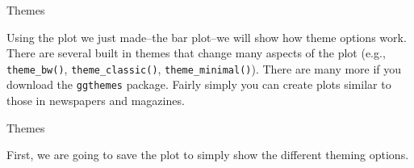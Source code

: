 \begin{frame}[fragile]{Themes}

Using the plot we just made--the bar plot--we will show how theme
options work. There are several built in themes that change many aspects
of the plot (e.g., \texttt{theme\_bw()}, \texttt{theme\_classic()},
\texttt{theme\_minimal()}). There are many more if you download the
\texttt{ggthemes} package. Fairly simply you can create plots similar to
those in newspapers and magazines.

\end{frame}

\begin{frame}[fragile]{Themes}

First, we are going to save the plot to simply show the different
theming options.

\begin{Shaded}
\begin{Highlighting}[]
\StringTok{ }\NormalTok{(}\NormalTok{)}
\StringTok{ }\NormalTok{(}
                             \OperatorTok{+}
\StringTok{  }\NormalTok{(}\NormalTok{(}
            \NormalTok{, }
           \NormalTok{) }\OperatorTok{+}
\StringTok{  }\NormalTok{(}\NormalTok{(}\OperatorTok{-}\StringTok{ }\OperatorTok{+}\StringTok{ }
                \NormalTok{) }\OperatorTok{+}
\StringTok{  }\NormalTok{(} \NormalTok{(}\NormalTok{, }
                                \NormalTok{)) }\OperatorTok{+}\StringTok{  }
\StringTok{  }\NormalTok{(} \NormalTok{(}\NormalTok{, }\NormalTok{))}
\end{Highlighting}
\end{Shaded}

\end{frame}


